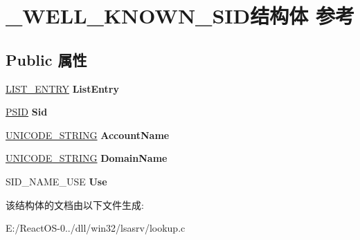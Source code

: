 \hypertarget{struct___w_e_l_l___k_n_o_w_n___s_i_d}{}\section{\+\_\+\+W\+E\+L\+L\+\_\+\+K\+N\+O\+W\+N\+\_\+\+S\+I\+D结构体 参考}
\label{struct___w_e_l_l___k_n_o_w_n___s_i_d}
\subsection*{Public 属性}
\begin{DoxyCompactItemize}
\item 
\mbox{\label{struct___w_e_l_l___k_n_o_w_n___s_i_d_acfccd2b463215f2d315b48e126fd2e87}} 
\hyperlink{struct___l_i_s_t___e_n_t_r_y}{L\+I\+S\+T\+\_\+\+E\+N\+T\+RY} {\bfseries List\+Entry}
\item 
\mbox{\label{struct___w_e_l_l___k_n_o_w_n___s_i_d_a2d48a97c3badb2c425ea60359b878753}} 
\hyperlink{struct___s_i_d}{P\+S\+ID} {\bfseries Sid}
\item 
\mbox{\label{struct___w_e_l_l___k_n_o_w_n___s_i_d_a05d36056d8d9348506ac4efe1e0a73a3}} 
\hyperlink{struct___u_n_i_c_o_d_e___s_t_r_i_n_g}{U\+N\+I\+C\+O\+D\+E\+\_\+\+S\+T\+R\+I\+NG} {\bfseries Account\+Name}
\item 
\mbox{\label{struct___w_e_l_l___k_n_o_w_n___s_i_d_a5feb006d96916989fe64226f5d8ea220}} 
\hyperlink{struct___u_n_i_c_o_d_e___s_t_r_i_n_g}{U\+N\+I\+C\+O\+D\+E\+\_\+\+S\+T\+R\+I\+NG} {\bfseries Domain\+Name}
\item 
\mbox{\label{struct___w_e_l_l___k_n_o_w_n___s_i_d_a970b3cffbb63a9a74fd14dd721947e0b}} 
S\+I\+D\+\_\+\+N\+A\+M\+E\+\_\+\+U\+SE {\bfseries Use}
\end{DoxyCompactItemize}


该结构体的文档由以下文件生成\+:\begin{DoxyCompactItemize}
\item 
E\+:/\+React\+O\+S-\/0../dll/win32/lsasrv/lookup.\+c\end{DoxyCompactItemize}

